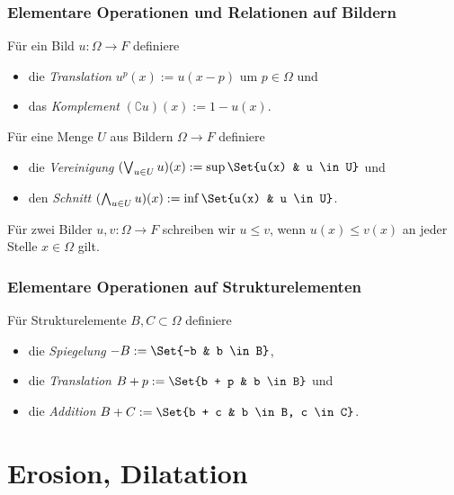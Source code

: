 \documentclass{beamer}
\begin{document}
\begin{frame}
    \frametitle{Elementare Operationen und Relationen auf Bildern}
    \begin{definition}
        Für ein Bild $u: \Omega \to F$ definiere
        \begin{itemize}
            \item \pause
                die \emph{Translation} $u^p(x) := u(x-p)$ um $p \in \Omega$ \pause und
            \item
                das \emph{Komplement} $(\complement u)(x) := 1 - u(x)$.
        \end{itemize}
        \pause
        Für eine Menge $U$ aus Bildern $\Omega \to F$ definiere
        \begin{itemize}
            \item \pause
                die \emph{Vereinigung} $(\bigvee_{u \in U} u)(x) := \sup \Set{u(x) & u \in U}$ \pause und
            \item
                den \emph{Schnitt} $(\bigwedge_{u \in U} u)(x) := \inf \Set{u(x) & u \in U}$.
        \end{itemize}
        \pause
        Für zwei Bilder $u, v: \Omega \to F$ schreiben wir $u \le v$, wenn $u(x) \le v(x)$ an jeder Stelle $x \in \Omega$ gilt.
    \end{definition}
\end{frame}

\begin{frame}
    \frametitle{Elementare Operationen auf Strukturelementen}
    \begin{definition}
        Für Strukturelemente $B, C \subset \Omega$ definiere
        \begin{itemize}
            \item \pause
                die \emph{Spiegelung} $-B := \Set{-b & b \in B}$\pause,
            \item
                die \emph{Translation} $B + p := \Set{b + p & b \in B}$ \pause und
            \item
                die \emph{Addition} $B + C := \Set{b + c & b \in B, c \in C}$.
        \end{itemize}
    \end{definition}
\end{frame}

\section{Erosion, Dilatation}
\end{document}
